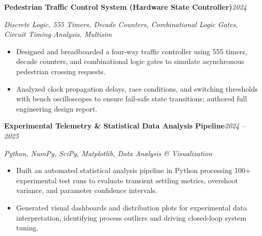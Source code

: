 \documentclass[10pt]{article}
\newcommand{\RoleDates}[2]{\noindent\textit{#1}\hfill\textit{#2}\par}
\newcommand{\ProjectHeading}[2]{\noindent\textbf{#1}\hfill\textit{#2}\par}
\begin{document}
\vspace{3.5pt}
\ProjectHeading{Pedestrian Traffic Control System (Hardware State Controller)}{2024}
\RoleDates{Discrete Logic, 555 Timers, Decade Counters, Combinational Logic Gates, Circuit Timing Analysis, Multisim}{}
\begin{itemize}
  \item Designed and breadboarded a four-way traffic controller using 555 timers, decade counters, and combinational logic gates to simulate asynchronous pedestrian crossing requests.
  \item Analyzed clock propagation delays, race conditions, and switching thresholds with bench oscilloscopes to ensure fail-safe state transitions; authored full engineering design report.
\end{itemize}

\vspace{3.5pt}
\ProjectHeading{Experimental Telemetry \& Statistical Data Analysis Pipeline}{2024 -- 2025}
\RoleDates{Python, NumPy, SciPy, Matplotlib, Data Analysis \& Visualization}{}
\begin{itemize}
  \item Built an automated statistical analysis pipeline in Python processing 100+ experimental test runs to evaluate transient settling metrics, overshoot variance, and parameter confidence intervals.
  \item Generated visual dashboards and distribution plots for experimental data interpretation, identifying process outliers and driving closed-loop system tuning.
\end{itemize}
\end{document}
